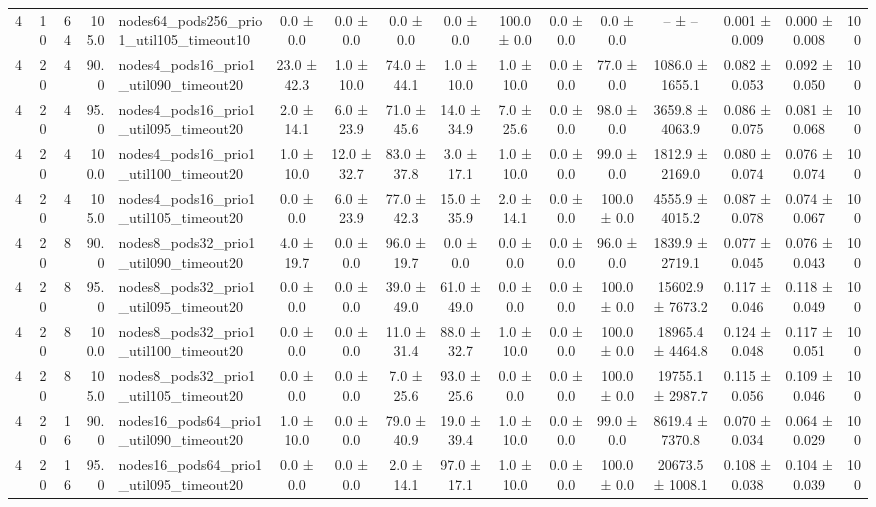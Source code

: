 \begin{tabular}{r r r r l c c c c c c c c c c r}
4 & 10 & 64 & 105.0 & nodes64\_pods256\_prio1\_util105\_timeout10 & 0.0 ± 0.0 & 0.0 ± 0.0 & 0.0 ± 0.0 & 0.0 ± 0.0 & 100.0 ± 0.0 & 0.0 ± 0.0 & 0.0 ± 0.0 & -- ± -- & 0.001 ± 0.009 & 0.000 ± 0.008 & 100 \\
4 & 20 & 4 & 90.0 & nodes4\_pods16\_prio1\_util090\_timeout20 & 23.0 ± 42.3 & 1.0 ± 10.0 & 74.0 ± 44.1 & 1.0 ± 10.0 & 1.0 ± 10.0 & 0.0 ± 0.0 & 77.0 ± 0.0 & 1086.0 ± 1655.1 & 0.082 ± 0.053 & 0.092 ± 0.050 & 100 \\
4 & 20 & 4 & 95.0 & nodes4\_pods16\_prio1\_util095\_timeout20 & 2.0 ± 14.1 & 6.0 ± 23.9 & 71.0 ± 45.6 & 14.0 ± 34.9 & 7.0 ± 25.6 & 0.0 ± 0.0 & 98.0 ± 0.0 & 3659.8 ± 4063.9 & 0.086 ± 0.075 & 0.081 ± 0.068 & 100 \\
4 & 20 & 4 & 100.0 & nodes4\_pods16\_prio1\_util100\_timeout20 & 1.0 ± 10.0 & 12.0 ± 32.7 & 83.0 ± 37.8 & 3.0 ± 17.1 & 1.0 ± 10.0 & 0.0 ± 0.0 & 99.0 ± 0.0 & 1812.9 ± 2169.0 & 0.080 ± 0.074 & 0.076 ± 0.074 & 100 \\
4 & 20 & 4 & 105.0 & nodes4\_pods16\_prio1\_util105\_timeout20 & 0.0 ± 0.0 & 6.0 ± 23.9 & 77.0 ± 42.3 & 15.0 ± 35.9 & 2.0 ± 14.1 & 0.0 ± 0.0 & 100.0 ± 0.0 & 4555.9 ± 4015.2 & 0.087 ± 0.078 & 0.074 ± 0.067 & 100 \\
4 & 20 & 8 & 90.0 & nodes8\_pods32\_prio1\_util090\_timeout20 & 4.0 ± 19.7 & 0.0 ± 0.0 & 96.0 ± 19.7 & 0.0 ± 0.0 & 0.0 ± 0.0 & 0.0 ± 0.0 & 96.0 ± 0.0 & 1839.9 ± 2719.1 & 0.077 ± 0.045 & 0.076 ± 0.043 & 100 \\
4 & 20 & 8 & 95.0 & nodes8\_pods32\_prio1\_util095\_timeout20 & 0.0 ± 0.0 & 0.0 ± 0.0 & 39.0 ± 49.0 & 61.0 ± 49.0 & 0.0 ± 0.0 & 0.0 ± 0.0 & 100.0 ± 0.0 & 15602.9 ± 7673.2 & 0.117 ± 0.046 & 0.118 ± 0.049 & 100 \\
4 & 20 & 8 & 100.0 & nodes8\_pods32\_prio1\_util100\_timeout20 & 0.0 ± 0.0 & 0.0 ± 0.0 & 11.0 ± 31.4 & 88.0 ± 32.7 & 1.0 ± 10.0 & 0.0 ± 0.0 & 100.0 ± 0.0 & 18965.4 ± 4464.8 & 0.124 ± 0.048 & 0.117 ± 0.051 & 100 \\
4 & 20 & 8 & 105.0 & nodes8\_pods32\_prio1\_util105\_timeout20 & 0.0 ± 0.0 & 0.0 ± 0.0 & 7.0 ± 25.6 & 93.0 ± 25.6 & 0.0 ± 0.0 & 0.0 ± 0.0 & 100.0 ± 0.0 & 19755.1 ± 2987.7 & 0.115 ± 0.056 & 0.109 ± 0.046 & 100 \\
4 & 20 & 16 & 90.0 & nodes16\_pods64\_prio1\_util090\_timeout20 & 1.0 ± 10.0 & 0.0 ± 0.0 & 79.0 ± 40.9 & 19.0 ± 39.4 & 1.0 ± 10.0 & 0.0 ± 0.0 & 99.0 ± 0.0 & 8619.4 ± 7370.8 & 0.070 ± 0.034 & 0.064 ± 0.029 & 100 \\
4 & 20 & 16 & 95.0 & nodes16\_pods64\_prio1\_util095\_timeout20 & 0.0 ± 0.0 & 0.0 ± 0.0 & 2.0 ± 14.1 & 97.0 ± 17.1 & 1.0 ± 10.0 & 0.0 ± 0.0 & 100.0 ± 0.0 & 20673.5 ± 1008.1 & 0.108 ± 0.038 & 0.104 ± 0.039 & 100 \\

\end{tabular}

